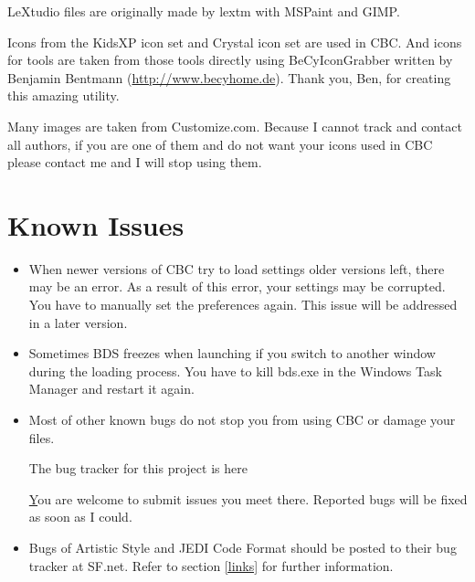 LeXtudio files are originally made by lextm with MSPaint and GIMP.

Icons from the KidsXP icon set and Crystal icon set are used in CBC. And icons
for tools are taken from those tools directly using BeCyIconGrabber written by
Benjamin Bentmann (\underline{http://www.becyhome.de}). Thank you, Ben, for
creating this amazing utility.

Many images are taken from Customize.com. Because I cannot track and contact all
authors, if you are one of them and do not want your icons used in CBC please
contact me and I will stop using them.

%
%

\chapter{Known Issues}
\begin{itemize}
  \item When newer versions of CBC try to load settings older versions
  left, there may be an error. As a result of this error, your settings may be
  corrupted. You have to manually set the preferences again. This issue will be
  addressed in a later version.

  \item Sometimes BDS freezes when launching if you switch to another window
  during the loading process. You have to kill bds.exe in the Windows Task
  Manager and restart it again.

  \item Most of other known bugs do not stop you from using CBC or damage your
  files.

  The bug tracker for this project is here

  \hyperlink{http://gforge.oss.org.cn/tracker/?atid=257}

  You are welcome to submit issues you meet there. Reported bugs will be fixed
  as soon as I could.

  \item Bugs of Artistic Style and JEDI Code Format should be posted to their
  bug tracker at SF.net. Refer to section \ref{links} for further information.
\end{itemize}
